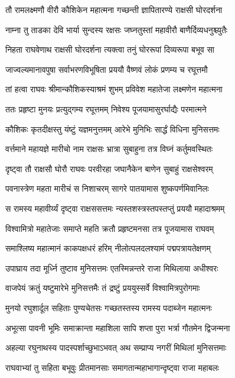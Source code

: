\twolineshloka
{तौ रामलक्ष्मणौ वीरौ कौशिकेन महात्मना}
{गच्छन्ती ज्ञापितारण्ये राक्षसी घोरदर्शना}%

\twolineshloka
{नाम्ना तु ताडका देवि भार्या सुन्दस्य रक्षसः}
{जघ्नतुस्तां महावीरौ बाणैर्दिव्यधनुश्च्युतैः}%

\twolineshloka
{निहता राघवेणाथ राक्षसी घोरदर्शना}
{त्यक्त्वा तनुं घोररूपां दिव्यरूपा बभूव सा}%

\twolineshloka
{जाज्वल्यमानावपुषा सर्वाभरणविभूषिता}
{प्रययौ वैष्णवं लोकं प्रणम्य च रघूत्तमौ}%

\twolineshloka
{तां हत्वा राघवः श्रीमान्कौशिकस्याश्रमं शुभम्}
{प्रविवेश महातेजा लक्ष्मणेन महात्मना}%

\twolineshloka
{ततः प्रहृष्टा मुनयः प्रत्युद्गम्य रघूत्तमम्}
{निवेश्य पूजयामासुरर्घाद्यैः परमात्मने}%

\twolineshloka
{कौशिकः कृतदीक्षस्तु यंष्टुं यज्ञमनुत्तमम्}
{आरेभे मुनिभिः सार्द्धं विधिना मुनिसत्तमः}%

\twolineshloka
{वर्त्तमाने महायज्ञे मारीचो नाम राक्षसः}
{भ्रात्रा सुबाहुना तत्र विघ्नं कर्तुमवस्थितः}%

\twolineshloka
{दृष्ट्वा तौ राक्षसौ घोरौ राघवः परवीरहा}
{जघानैकेन बाणेन सुबाहुं राक्षसेश्वरम्}%

\twolineshloka
{पवनास्त्रेण महता मारीचं स निशाचरम्}
{सागरे पातयामास शुष्कपर्णमिवानिलः}%

\twolineshloka
{स रामस्य महावीर्य्यं दृष्ट्वा राक्षससत्तमः}
{न्यस्तशस्त्रस्तपस्तप्तुं प्रययौ महादाश्रमम्}%

\twolineshloka
{विश्वामित्रो महातेजाः समाप्ते महति क्रतौ}
{प्रहृष्टमनसा तत्र पूजयामास राघवम्}%

\twolineshloka
{समाश्लिष्य महात्मानं काकपक्षधरं हरिम्}
{नीलोत्पलदलश्यामं पद्मपत्रायतेक्षणम्}%

\twolineshloka
{उपाघ्राय तदा मूर्ध्नि तुष्टाव मुनिसत्तमः}
{एतस्मिन्नन्तरे राजा मिथिलाया अधीश्वरः}%

\twolineshloka
{वाजपेयं क्रतुं यष्टुमारेभे मुनिसत्तमैः}
{तं द्रष्टुं प्रययुस्सर्वे विश्वामित्रपुरोगमाः}%

\twolineshloka
{मुनयो रघुशार्दूल सहिताः पुण्यचेतसः}
{गच्छतस्तस्य रामस्य पदाब्जेन महात्मनः}%

\twolineshloka
{अभूत्सा पावनी भूमिः समाक्रान्ता महाशिला}
{सापि शप्ता पुरा भर्त्रा गौतमेन द्विजन्मना}%

\twolineshloka
{अहल्या रघुनाथस्य पादस्पर्शाच्छुभाऽभवत्}
{अथ सम्प्राप्य नगरीं मिथिलां मुनिसत्तमाः}%

\twolineshloka
{राघवाभ्यां तु सहिता बभूवुः प्रीतमानसाः}
{समागतान्महाभागान्दृष्ट्वा राजा महाबलः}%

